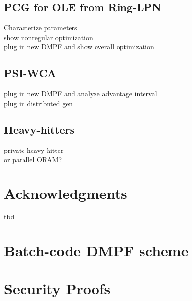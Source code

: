 \documentclass[sigconf]{acmart}
\begin{document}
\subsection{PCG for OLE from Ring-LPN}
Characterize parameters\\
show nonregular optimization\\
plug in new DMPF and show overall optimization
\subsection{PSI-WCA}
plug in new DMPF and analyze advantage interval\\
plug in distributed gen
\subsection{Heavy-hitters}
private heavy-hitter\\
or parallel ORAM?
\section{Acknowledgments}
tbd






\appendix
\section{Batch-code DMPF scheme}
\section{Security Proofs}
\end{document}
